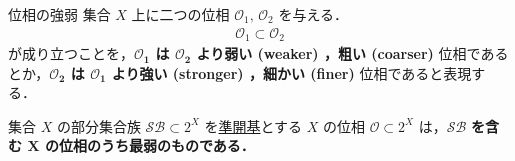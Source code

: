 \documentclass[geometry_main]{subfiles}
\begin{document}
\begin{mydef}[label=def.intensity_topo]{位相の強弱}
	集合 $X$ 上に二つの位相 $\mathscr{O}_1,\, \mathscr{O}_2$ を与える．
	\begin{align}
		\mathscr{O}_1 \subset \mathscr{O}_2
	\end{align}
	が成り立つことを，\textbf{$\bm{\mathscr{O}_1}$ は $\bm{\mathscr{O}_2}$ より弱い (weaker) ，粗い (coarser) } 位相であるとか，\textbf{$\bm{\mathscr{O}_2}$ は $\bm{\mathscr{O}_1}$ より強い (stronger) ，細かい (finer) } 位相であると表現する．
\end{mydef}

\begin{marker}\label{remark:subbase}
	集合 $X$ の部分集合族 $\mathcal{SB} \subset 2^X$ を\hyperref[def:subbase]{準開基}とする $X$ の位相 $\mathscr{O} \subset 2^X$ は，$\bm{\mathcal{SB}}$ \textbf{を含む $\bm{X}$ の位相のうち最弱のものである．}
\end{marker}


	

\end{document}
